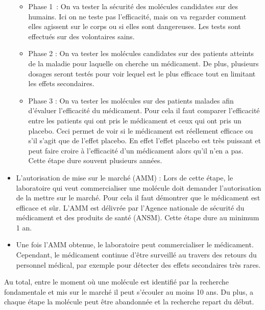 \documentclass[12pt,a4paper]{report}
\begin{document}
\begin{appendix}
\begin{itemize}
    \begin{itemize}
        \item Phase 1 : On va tester la sécurité des molécules candidates sur des humains. Ici on ne teste pas l'efficacité, mais on va regarder comment elles agissent sur le corps ou si elles sont dangereuses. Les tests sont effectués sur des volontaires sains.
        \item Phase 2 : On va tester les molécules candidates sur des patients atteints de la maladie pour laquelle on cherche un médicament. De plus, plusieurs dosages seront testés pour voir lequel est le plus efficace tout en limitant les effets secondaires.
        \item Phase 3 : On va tester les molécules sur des patients malades afin d'évaluer l'efficacité du médicament. Pour cela il faut comparer l'efficacité entre les patients qui ont pris le médicament et ceux qui ont pris un placebo. Ceci permet de voir si le médicament est réellement efficace ou s'il s'agit que de l'effet placebo. En effet l'effet placebo est très puissant et peut faire croire à l'efficacité d'un médicament alors qu'il n'en a pas. \cite{decraenPlacebosPlaceboEffects1999} Cette étape dure souvent plusieurs années.
    \end{itemize}

    \item L’autorisation de mise sur le marché (AMM) : Lors de cette étape, le laboratoire qui veut commercialiser une molécule doit demander l'autorisation de la mettre sur le marché. Pour cela il faut démontrer que le médicament est efficace et sûr. L'AMM est délivrée par l'Agence nationale de sécurité du médicament et des produits de santé (ANSM). Cette étape dure au minimum 1 an.
    \item Une fois l'AMM obtenue, le laboratoire peut commercialiser le médicament. Cependant, le médicament continue d'être surveillé au travers des retours du personnel médical, par exemple pour détecter des effets secondaires très rares.
\end{itemize}

Au total, entre le moment où une molécule est identifié par la recherche fondamentale et mis sur le marché il peut s'écouler au moins 10 ans. \cite{DeveloppementMedicamentInserm} Du plus, a chaque étape la molécule peut être abandonnée et la recherche repart du début. \cite{denisvanwaerebekeJamesOuRoman2018}

\end{appendix}

\printbibliography
\end{document}
